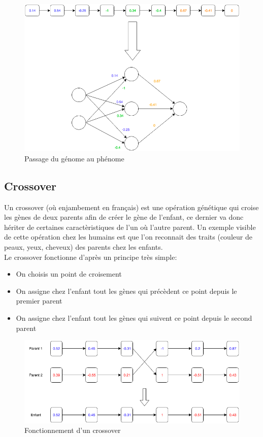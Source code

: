 \documentclass{article}
\begin{document}
\begin{figure}[h]
\begin{center}
	\includegraphics[scale=0.5]{genomephenome.png}
	\caption{Passage du génome au phénome}
\end{center}
\end{figure}
\newpage

\subsection{Crossover}

Un crossover (où enjambement en français) est une opération génétique qui croise les gènes de deux parents afin de créer le gène de l'enfant, ce dernier va donc hériter de certaines caractèristiques de l'un où l'autre parent. Un exemple visible de cette opération chez les humains est que l'on reconnait des traits (couleur de peaux, yeux, cheveux) des parents chez les enfants.\\

Le crossover fonctionne d'après un principe très simple:\\
\begin{itemize}
\item On choisis un point de croisement
\item On assigne chez l'enfant tout les gènes qui précèdent ce point depuis le premier parent
\item On assigne chez l'enfant tout les gènes qui suivent ce point depuis le second parent
\end{itemize}

\begin{figure}[h]
\begin{center}
	\includegraphics[scale=0.6]{"crossover.png"} 
	\caption{Fonctionnement d'un crossover}
\end{center}
\end{figure}
\newpage
\end{document}
